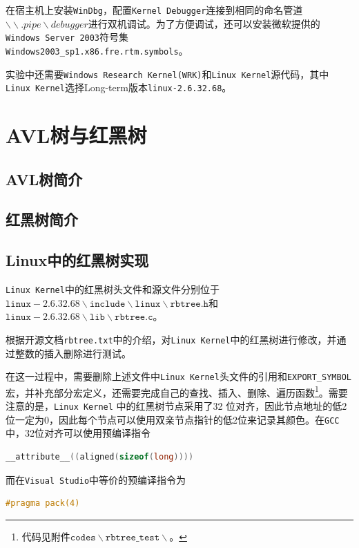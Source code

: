 \documentclass[a4paper, 11pt]{article}
\begin{document}
        在宿主机上安装\texttt{WinDbg}，配置\texttt{Kernel Debugger}连接到相同的命名管道$\backslash\backslash.pipe\backslash debugger$进行双机调试。为了方便调试，还可以安装微软提供的
        \texttt{Windows Server 2003}符号集\\
        \texttt{Windows2003\_sp1.x86.fre.rtm.symbols}。
        
        实验中还需要\texttt{Windows Research Kernel(WRK)}和\texttt{Linux Kernel}源代码，其中\texttt{Linux Kernel}选择Long-term版本\texttt{linux-2.6.32.68}。
        
    \section{AVL树与红黑树}
        \subsection{AVL树简介}
        
        \subsection{红黑树简介}
        
        \subsection{Linux中的红黑树实现}
            \texttt{Linux Kernel}中的红黑树头文件和源文件分别位于 \\
            $\mathtt{linux-2.6.32.68\backslash include \backslash linux \backslash rbtree.h}$和 \\
            $\mathtt{linux-2.6.32.68 \backslash lib \backslash rbtree.c}$。
            
            根据开源文档\texttt{rbtree.txt}\cite{rbtreetxt}中的介绍，对\texttt{Linux Kernel}中的红黑树进行修改，并通过整数的插入删除进行测试。
            
            在这一过程中，需要删除上述文件中\texttt{Linux Kernel}头文件的引用和\texttt{EXPORT\_SYMBOL}宏，并补充部分宏定义，还需要完成自己的查找、插入、删除、遍历函数\footnote{代码见附件$\mathtt{codes\backslash rbtree\_test\backslash}$。}。需要注意的是，\texttt{Linux Kernel} 中的红黑树节点采用了32 位对齐，因此节点地址的低2位一定为0，因此每个节点可以使用双亲节点指针的低2位来记录其颜色。在\texttt{GCC}中，32位对齐可以使用预编译指令
\begin{lstlisting}[language={C}]
__attribute__((aligned(sizeof(long))))
\end{lstlisting}
            而在\texttt{Visual Studio}中等价的预编译指令为
\begin{lstlisting}[language={C}]
#pragma pack(4)
\end{lstlisting}
            
\end{document}
